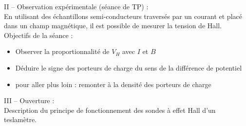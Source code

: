 \documentclass[a4paper,11pt]{article} %
\newenvironment{encart}[1]{%
	\begin{tcolorbox}
		[
		breakable, enhanced jigsaw, %
		arc = 1mm, %
		title = \textbf{#1}, %
		coltitle = white, %
		colbacktitle = blue, %
		colback = white, %
		colframe = blue %
		]
}{		
	\end{tcolorbox}
}
\begin{document}
\begin{encart}{Activité pédagogique 1 : étude de l'effet Hall classique}
		II -- Observation expérimentale (séance de TP) :\\
		En utilisant des échantillons semi-conducteurs traversés par un courant et placé dans un champ magnétique, il est possible de mesurer la tension de Hall.\\
		Objectifs de la séance :
		\begin{itemize}
			\item Observer la proportionnalité de $ V_H $ avec $ I $ et $ B $
			\item Déduire le signe des porteurs de charge du sens de la différence de potentiel
			\item pour aller plus loin : remonter à la densité des porteurs de charge
		\end{itemize}
		
		\vspace{0.5cm}
		III -- Ouverture :\\
		Description du principe de fonctionnement des sondes à effet Hall d'un teslamètre.
		

\end{encart}
\end{document}
